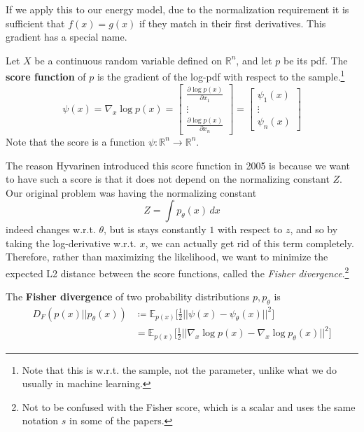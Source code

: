 \documentclass{article}
\begin{document}
    If we apply this to our energy model, due to the normalization requirement it is sufficient that $f(x) = g(x)$ if they match in their first derivatives. This gradient has a special name. 

    \begin{definition}[Score]
      Let $X$ be a continuous random variable defined on $\mathbb{R}^n$, and let $p$ be its pdf. The \textbf{score function} of $p$ is the gradient of the log-pdf with respect to the sample.\footnote{Note that this is w.r.t. the sample, not the parameter, unlike what we do usually in machine learning.}
      \begin{equation}
        \psi (x) = \nabla_x \log p(x) = \begin{bmatrix} \frac{\partial \log{p(x)}}{\partial x_1} \\ \vdots \\ \frac{\partial \log{p(x)}}{\partial x_n} \end{bmatrix} =  
        \begin{bmatrix}
          \psi_1 (x) \\ \vdots \\ \psi_n (x)
        \end{bmatrix} 
      \end{equation}
      Note that the score is a function $\psi: \mathbb{R}^n \rightarrow \mathbb{R}^n$. 
    \end{definition} 

    The reason Hyvarinen introduced this score function in 2005 is because we want to have such a score is that it does not depend on the normalizing constant $Z$. Our original problem was having the normalizing constant 
    \begin{equation}
      Z = \int p_\theta (x) \,dx
    \end{equation} 
    indeed changes w.r.t. $\theta$, but is stays constantly $1$ with respect to $z$, and so by taking the log-derivative w.r.t. $x$, we can actually get rid of this term completely. \cite{orig_score} Therefore, rather than maximizing the likelihood, we want to minimize the expected L2 distance between the score functions, called the \textit{Fisher divergence}.\footnote{Not to be confused with the Fisher score, which is a scalar and uses the same notation $s$ in some of the papers.} 

    \begin{definition}
      The \textbf{Fisher divergence} of two probability distributions $p, p_\theta$ is 
      \begin{align}
        D_F (p(x) || p_\theta (x)) & \coloneqq \mathbb{E}_{p(x)} \bigg[ \frac{1}{2} || \psi(x) - \psi_\theta(x) ||^2 \bigg] \\
                                   & = \mathbb{E}_{p(x)} \bigg[ \frac{1}{2} || \nabla_x \log p(x) - \nabla_x \log p_\theta (x) ||^2 \bigg]
      \end{align}
    \end{definition} 
\end{document}

